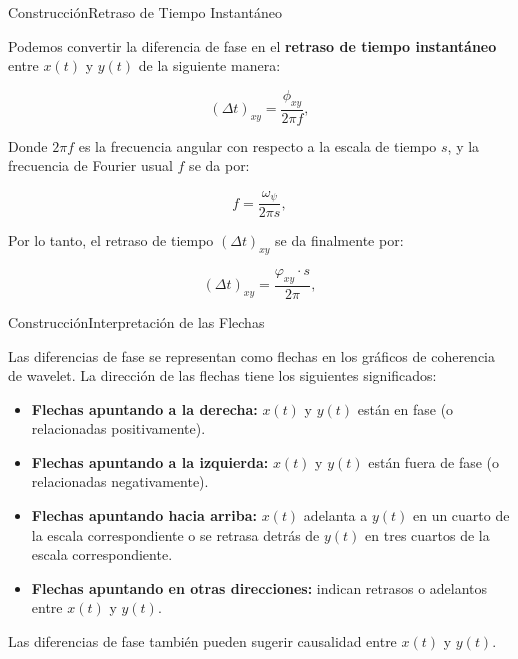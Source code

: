 \documentclass[11pt]{beamer}
\begin{document}
    \begin{frame}{Construcción}{Retraso de Tiempo Instantáneo}

    Podemos convertir la diferencia de fase en el \textbf{retraso de tiempo instantáneo} entre $x(t)$ y $y(t)$ de la siguiente manera:

    \begin{equation}
	(\Delta t)_{xy}=\frac{\phi_{xy}}{2\pi f},
    \end{equation}

    Donde $2\pi f$ es la frecuencia angular con respecto a la escala de tiempo $s$, y la frecuencia de Fourier usual $f$ se da por:

    \begin{equation}
	f = \frac{\omega_\psi}{2\pi s},
    \end{equation}

    Por lo tanto, el retraso de tiempo $(\Delta t)_{xy}$ se da finalmente por:

    \begin{equation}
	(\Delta t)_{xy}=\frac{\varphi_{xy}\cdot s}{2\pi},
    \end{equation}

    \end{frame}

    \begin{frame}{Construcción}{Interpretación de las Flechas}

    Las diferencias de fase se representan como flechas en los gráficos de coherencia de wavelet. La dirección de las flechas tiene los siguientes significados:

    \begin{itemize}
	\item \textbf{Flechas apuntando a la derecha:} $x(t)$ y $y(t)$ están en fase (o relacionadas positivamente).
	\item \textbf{Flechas apuntando a la izquierda:} $x(t)$ y $y(t)$ están fuera de fase (o relacionadas negativamente).
	\item \textbf{Flechas apuntando hacia arriba:} $x(t)$ adelanta a $y(t)$ en un cuarto de la escala correspondiente o se retrasa detrás de $y(t)$ en tres cuartos de la escala correspondiente.
	\item \textbf{Flechas apuntando en otras direcciones:} indican retrasos o adelantos entre $x(t)$ y $y(t)$.
    \end{itemize}

    Las diferencias de fase también pueden sugerir causalidad entre $x(t)$ y $y(t)$.

    \end{frame}
\end{document}
